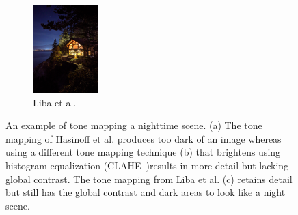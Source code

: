 \documentclass{sig-alternate}
\begin{document}
\begin{figure}
\begin{subfigure}{6pc}
\includegraphics[width=6pc]{figures/liba2019-figure-14c-95quality.jpg}
\caption{Liba et al.}
\label{fig:toneMapping:liba}
\end{subfigure}

\caption{An example of tone mapping a nighttime scene. (a) The tone mapping of Hasinoff et al. \cite{Hasinoff2016} produces too dark of an image whereas using a different tone mapping technique (b) that brightens using histogram equalization (CLAHE~\cite{CLAHE})results in more detail but lacking global contrast. The tone mapping from Liba et al. (c) retains detail but still has the global contrast and dark areas to look like a night scene.~\cite{Liba2019}}


\label{fig:toneMapping}
\end{figure}
\end{document}

